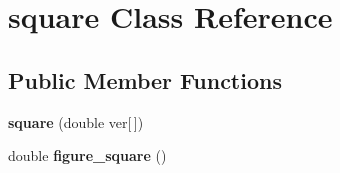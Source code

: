 \hypertarget{classsquare}{}\section{square Class Reference}
\label{classsquare}
\subsection*{Public Member Functions}
\begin{DoxyCompactItemize}
\item 
\mbox{\label{classsquare_a15254b64f3895564186ed88f63cf6304}} 
{\bfseries square} (double ver\mbox{[}$\,$\mbox{]})
\item 
\mbox{\label{classsquare_ae56cbb4ed06fb6012f28cf2b7114e89e}} 
double {\bfseries figure\+\_\+square} ()
\end{DoxyCompactItemize}
